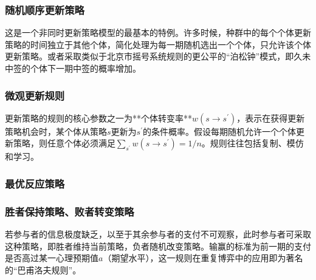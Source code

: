 \documentclass[lang=cn,12pt,a4paper]{elegantpaper}
\begin{document}
\subsubsection{随机顺序更新策略}

这是一个非同时更新策略模型的最基本的特例。许多时候，种群中的每个个体更新策略的时间独立于其他个体，简化处理为每一期随机选出一个个体，只允许该个体更新策略。或者采取类似于北京市摇号系统规则的更公平的“泊松钟”模式，即久未中签的个体下一期中签的概率增加。

\subsubsection{微观更新规则}

更新策略的规则的核心参数之一为**个体转变率**$w(s\rightarrow s^\prime)$，表示在获得更新策略机会时，某个体从策略$s$更新为$s^\prime$的条件概率。假设每期随机允许一个个体更新策略，则任意个体必须满足$\sum_{s^\prime} w(s\rightarrow s^\prime)=1/n$。规则往往包括复制、模仿和学习。

\subsubsection{最优反应策略}

\subsubsection{胜者保持策略、败者转变策略}

若参与者的信息极度缺乏，以至于其余参与者的支付不可观察，此时参与者可采取这种策略，即胜者维持当前策略，负者随机改变策略。输赢的标准为前一期的支付是否高过某一心理预期值$a$（期望水平），这一规则在重复博弈中的应用即为著名的“巴甫洛夫规则”。
\end{document}
